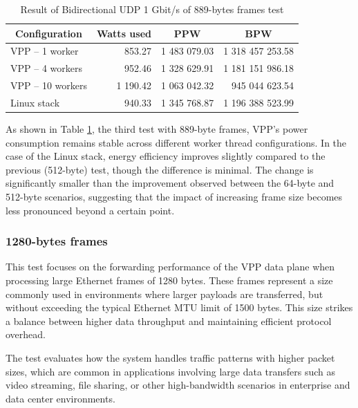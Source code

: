 \begin{table}[h!]
\centering
\begin{tabular}{|l|r|r|r|}
\hline
\multicolumn{1}{|c|}{\textbf{Configuration}} &
\multicolumn{1}{c|}{\textbf{Watts used}} &
\multicolumn{1}{c|}{\textbf{PPW}} &
\multicolumn{1}{c|}{\textbf{BPW}} \\
\hline
VPP -- 1 worker & 853.27 & 1 483 079.03 & 1 318 457 253.58 \\
VPP -- 4 workers & 952.46 & 1 328 629.91 & 1 181 151 986.18 \\
VPP -- 10 workers & 1 190.42 & 1 063 042.32 & 945 044 623.54 \\
Linux stack & 940.33 & 1 345 768.87 & 1 196 388 523.99 \\
\hline
\end{tabular}
\caption{Result of Bidirectional UDP 1 Gbit/s of 889-bytes frames test}
\label{tab:udp:three}
\end{table}

As shown in Table \ref{tab:udp:three}, the third test with 889-byte frames, 
VPP's power consumption remains stable across different worker thread configurations. 
In the case of the Linux stack, energy efficiency improves slightly compared to the previous (512-byte) test, though the difference is minimal. 
The change is significantly smaller than the improvement observed between the 64-byte and 512-byte scenarios, suggesting that the impact of increasing frame size becomes less pronounced beyond a certain point.

\subsubsection{1280-bytes frames}
This test focuses on the forwarding performance of the VPP data plane when processing large Ethernet frames of 1280 bytes. 
These frames represent a size commonly used in environments where larger payloads are transferred, but without exceeding the typical Ethernet MTU limit of 1500 bytes. 
This size strikes a balance between higher data throughput and maintaining efficient protocol overhead.

The test evaluates how the system handles traffic patterns with higher packet sizes, which are common in applications involving large data transfers such as video streaming, 
file sharing, or other high-bandwidth scenarios in enterprise and data center environments.

